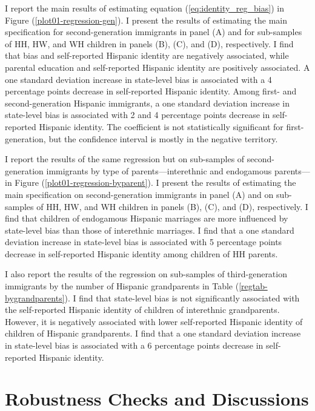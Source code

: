 \documentclass[12pt,english]{article}
\begin{document}
I report the main results of estimating equation (\ref{eq:identity_reg_bias}) in Figure (\ref{plot01-regression-gen}). I present the results of estimating the main specification for second-generation immigrants in panel (A) and for sub-samples of HH, HW, and WH children in panels (B), (C), and (D), respectively. I find that bias and self-reported Hispanic identity are negatively associated, while parental education and self-reported Hispanic identity are positively associated. A one standard deviation increase in state-level bias is associated with a 4 percentage points decrease in self-reported Hispanic identity. Among first- and second-generation Hispanic immigrants, a one standard deviation increase in state-level bias is associated with 2 and 4 percentage points decrease in self-reported Hispanic identity. The coefficient is not statistically significant for first-generation, but the confidence interval is mostly in the negative territory.

I report the results of the same regression but on sub-samples of second-generation immigrants by type of parents---interethnic and endogamous parents---in Figure (\ref{plot01-regression-byparent}). I present the results of estimating the main specification on second-generation immigrants in panel (A) and on sub-samples of HH, HW, and WH children in panels (B), (C), and (D), respectively. I find that children of endogamous Hispanic marriages are more influenced by state-level bias than those of interethnic marriages. I find that a one standard deviation increase in state-level bias is associated with 5 percentage points decrease in self-reported Hispanic identity among children of HH parents. 

I also report the results of the regression on sub-samples of third-generation immigrants by the number of Hispanic grandparents in Table (\ref{regtab-bygrandparents}). I find that state-level bias is not significantly associated with the self-reported Hispanic identity of children of interethnic grandparents. However, it is negatively associated with lower self-reported Hispanic identity of children of Hispanic grandparents. I find that a one standard deviation increase in state-level bias is associated with a 6 percentage points decrease in self-reported Hispanic identity.

\section{Robustness Checks and Discussions} %
\label{sec:robcheck}
\end{document}
